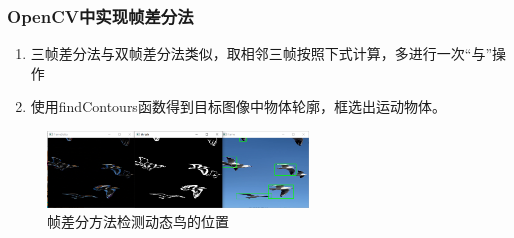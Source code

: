 \begin{frame}
    \frametitle{OpenCV中实现帧差分法}

    \begin{enumerate}
        \item 三帧差分法与双帧差分法类似，取相邻三帧按照下式计算，多进行一次“与”操作
        \item 使用findContours函数得到目标图像中物体轮廓，框选出运动物体。
    \end{enumerate}

    \begin{figure}
        \centering
        \includegraphics[width=0.618\textwidth]{images/frame_diff_bird.png}
        \caption{帧差分方法检测动态鸟的位置}
    \end{figure}

\end{frame}